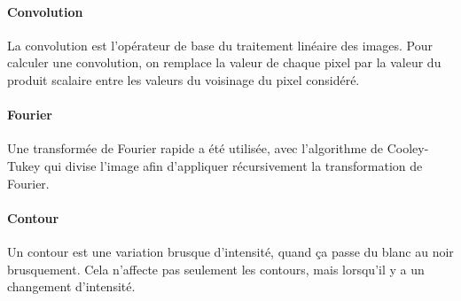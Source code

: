 	\paragraph{Convolution}
	\label{Convolution}

	La convolution est l'opérateur de base du traitement linéaire des images. Pour calculer une convolution, on remplace la valeur de chaque pixel par la valeur du produit scalaire entre les valeurs du voisinage du pixel considéré.

	\paragraph{Fourier}
	\label{Fourier}

	Une transformée de Fourier rapide a été utilisée, avec l'algorithme de Cooley-Tukey qui divise l'image afin d'appliquer récursivement la transformation de Fourier.

	\paragraph{Contour}
	
	Un contour est une variation brusque d'intensité, quand ça passe du blanc au noir brusquement. Cela n'affecte pas seulement les contours, mais lorsqu'il y a un changement d'intensité.

